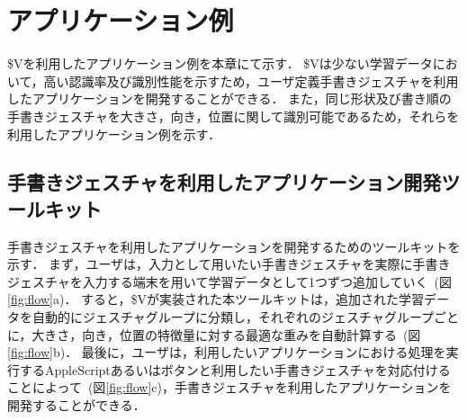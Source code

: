 \chapter{アプリケーション例}
\$Vを利用したアプリケーション例を本章にて示す．
\$Vは少ない学習データにおいて，高い認識率及び識別性能を示すため，ユーザ定義手書きジェスチャを利用したアプリケーションを開発することができる．
また，同じ形状及び書き順の手書きジェスチャを大きさ，向き，位置に関して識別可能であるため，それらを利用したアプリケーション例を示す．

\section{手書きジェスチャを利用したアプリケーション開発ツールキット}
手書きジェスチャを利用したアプリケーションを開発するためのツールキットを示す．
まず，ユーザは，入力として用いたい手書きジェスチャを実際に手書きジェスチャを入力する端末を用いて学習データとして1つずつ追加していく~(図\ref{fig:flow}a)．
すると，\$Vが実装された本ツールキットは，追加された学習データを自動的にジェスチャグループに分類し，それぞれのジェスチャグループごとに，大きさ，向き，位置の特徴量に対する最適な重みを自動計算する~(図\ref{fig:flow}b)．
最後に，ユーザは，利用したいアプリケーションにおける処理を実行するAppleScriptあるいはボタンと利用したい手書きジェスチャを対応付けることによって~(図\ref{fig:flow}c)，手書きジェスチャを利用したアプリケーションを開発することができる．

